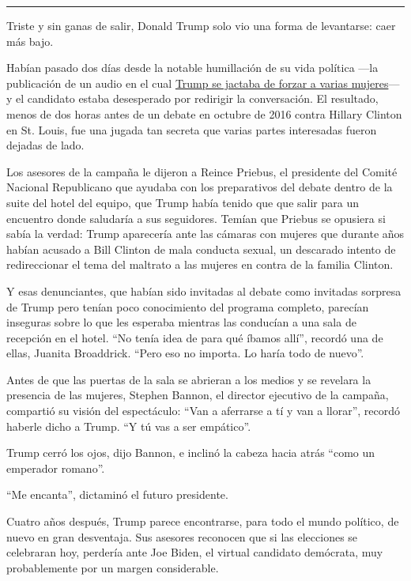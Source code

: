 \begin{center}\rule{0.5\linewidth}{\linethickness}\end{center}

Triste y sin ganas de salir, Donald Trump solo vio una forma de
levantarse: caer más bajo.

Habían pasado dos días desde la notable humillación de su vida política
---la publicación de un audio en el cual
\href{https://www.nytimes.com/2016/10/08/us/donald-trump-tape-transcript.html}{Trump
se jactaba de forzar a varias mujeres}--- y el candidato estaba
desesperado por redirigir la conversación. El resultado, menos de dos
horas antes de un debate en octubre de 2016 contra Hillary Clinton en
St. Louis, fue una jugada tan secreta que varias partes interesadas
fueron dejadas de lado.

Los asesores de la campaña le dijeron a Reince Priebus, el presidente
del Comité Nacional Republicano que ayudaba con los preparativos del
debate dentro de la suite del hotel del equipo, que Trump había tenido
que que salir para un encuentro donde saludaría a sus seguidores. Temían
que Priebus se opusiera si sabía la verdad: Trump aparecería ante las
cámaras con mujeres que durante años habían acusado a Bill Clinton de
mala conducta sexual, un descarado intento de redireccionar el tema del
maltrato a las mujeres en contra de la familia Clinton.

Y esas denunciantes, que habían sido invitadas al debate como invitadas
sorpresa de Trump pero tenían poco conocimiento del programa completo,
parecían inseguras sobre lo que les esperaba mientras las conducían a
una sala de recepción en el hotel. ``No tenía idea de para qué íbamos
allí'', recordó una de ellas, Juanita Broaddrick. ``Pero eso no importa.
Lo haría todo de nuevo''.

Antes de que las puertas de la sala se abrieran a los medios y se
revelara la presencia de las mujeres, Stephen Bannon, el director
ejecutivo de la campaña, compartió su visión del espectáculo: ``Van a
aferrarse a tí y van a llorar'', recordó haberle dicho a Trump. ``Y tú
vas a ser empático''.

Trump cerró los ojos, dijo Bannon, e inclinó la cabeza hacia atrás
``como un emperador romano''.

``Me encanta'', dictaminó el futuro presidente.

Cuatro años después, Trump parece encontrarse, para todo el mundo
político, de nuevo en gran desventaja. Sus asesores reconocen que si las
elecciones se celebraran hoy, perdería ante Joe Biden, el virtual
candidato demócrata, muy probablemente por un margen considerable.

